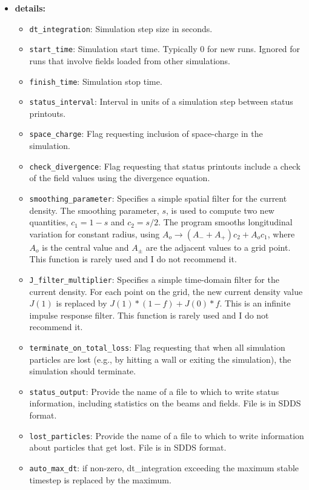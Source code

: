\begin{itemize}
\item {\bf details:} 
\begin{itemize}
    \item {\tt dt\_integration}: Simulation step size in seconds.
    \item {\tt start\_time}: Simulation start time.  Typically 0 for new runs.
        Ignored for runs that involve fields loaded from other simulations.
    \item {\tt finish\_time}: Simulation stop time.
    \item {\tt status\_interval}: Interval in units of a simulation step between 
        status printouts.
    \item {\tt space\_charge}: Flag requesting inclusion of space-charge in the
        simulation.
    \item {\tt check\_divergence}: Flag requesting that status printouts include
        a check of the field values using the divergence equation.
    \item {\tt smoothing\_parameter}: Specifies a simple spatial filter for the
        current density.  The smoothing parameter, $s$, is used to compute two
        new quantities, $c_1 = 1-s$ and $c_2 = s/2$.  The program smooths longitudinal
        variation for constant radius, using $A_o \rightarrow (A_- + A_+)c_2 + A_o c_1$,
        where $A_o$ is the central value and $A_\pm$ are the adjacent values to a grid point.
        This function is rarely used and I do not recommend it.
    \item {\tt J\_filter\_multiplier}: Specifies a simple time-domain filter for the
        current density.  For each point on the grid, the new current density value $J(1)$ is
        replaced by $J(1)*(1-f) + J(0)*f$.  This is an infinite impulse response filter.
        This function is rarely used and I do not recommend it.
    \item {\tt terminate\_on\_total\_loss}: Flag requesting that when all simulation particles
        are lost (e.g., by hitting a wall or exiting the simulation), the simulation should
        terminate.
    \item {\tt status\_output}: Provide the name of a file to which to write status information,
        including statistics on the beams and fields.  File is in SDDS format.
    \item {\tt lost\_particles}: Provide the name of a file to which to write information about
        particles that get lost.  File is in SDDS format.
    \item {\tt auto\_max\_dt}: if non-zero, dt\_integration exceeding the maximum stable timestep is replaced by the maximum.
\end{itemize}

\end{itemize}
